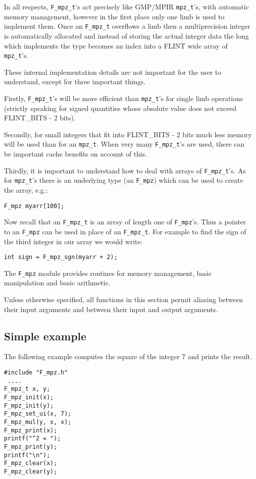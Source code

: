 \documentclass[a4paper,10pt]{article}
\newcommand{\code}{\lstinline}
\begin{document}
In all respects, \code{F_mpz_t}'s act precisely like GMP/MPIR \code{mpz_t}'s, with automatic memory management, however in the first place only one limb is used to implement them. Once an \code{F_mpz_t} overflows a limb then a multiprecision integer is automatically allocated and instead of storing the actual integer data the long which implements the type becomes an index into a FLINT wide array of \code{mpz_t}'s.

These internal implementation details are not important for the user to understand, except for three important things.

Firstly, \code{F_mpz_t}'s will be more efficient than \code{mpz_t}'s for single limb operations (strictly speaking for signed quantities whose absolute value does not exceed FLINT\_BITS - 2 bits).

Secondly, for small integers that fit into FLINT\_BITS - 2 bits much less memory will be used than for an \code{mpz_t}. When very many \code{F_mpz_t}'s are used, there can be important cache benefits on account of this.

Thirdly, it is important to understand how to deal with arrays of \code{F_mpz_t}'s. As for \code{mpz_t}'s there is an underlying type (an \code{F_mpz}) which can be used to create the array, e.g.:

\code{F_mpz myarr[100];}

Now recall that an \code{F_mpz_t} is an array of length one of \code{F_mpz}'s. Thus a pointer to an \code{F_mpz} can be used in place of an \code{F_mpz_t}. For example to find the sign of the third integer in our array we would write:

\code{int sign = F_mpz_sgn(myarr + 2);}

The \code{F_mpz} module provides routines for memory management, basic manipulation and basic arithmetic.

Unless otherwise specified, all functions in this section permit aliasing between their input arguments and between their input and output arguments. 

\subsection{Simple example}

The following example computes the square of the integer 7 and prints the result.

\begin{lstlisting}
#include "F_mpz.h"
 ....
F_mpz_t x, y;
F_mpz_init(x);
F_mpz_init(y);
F_mpz_set_ui(x, 7);
F_mpz_mul(y, x, x);
F_mpz_print(x);
printf("^2 = ");
F_mpz_print(y);
printf("\n");
F_mpz_clear(x);
F_mpz_clear(y);
\end{lstlisting}
\end{document}
